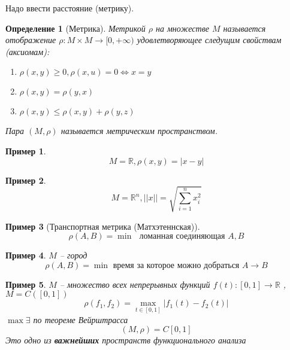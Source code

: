 \documentclass[14pt]{extarticle}
\newtheorem{definition}{Определение}
\newtheorem{example}{Пример}[definition]
\begin{document}
Надо ввести расстояние (метрику).
\begin{definition}[Метрика]
	Метрикой $\rho$ на множестве  $M$ 
	называется отображение  $\rho : M \times M \to [0,+ \infty)$
	удовлетворяющее следущим свойствам (аксиомам):
	 \begin{enumerate}
		\item $\rho(x,y) \ge 0, \rho(x,u) = 0 \iff x = y$
		\item $\rho(x,y) = \rho(y,x)$
		\item  $\rho(x,y) \le \rho(x,y) + \rho(y,z)$
	\end{enumerate}
	Пара $(M,\rho)$ называется метрическим пространством.
\end{definition}
\begin{example}
	\begin{equation}
		M = \mathbb{R}, \rho(x,y) = |x- y|
	\end{equation}
\end{example}
\begin{example}
	\begin{equation}
		M = \mathbb{R}^{n}, ||x|| =  \sqrt{\sum_{i=1}^{n}x_{i}^2} 
	\end{equation}
\end{example}
\begin{example}[Транспортная метрика (Матхэтеннская)]
	\begin{equation}
		\rho(A,B) = \min \text{~ ломанная соединяющая } A, B
	\end{equation}
\end{example}
\begin{example}
	$M$ -- город
	 \begin{equation}
		 \rho(A,B) = \min \text{ время за которое можно добраться~} A \to B
	\end{equation}
\end{example}
\begin{example}
	$M$ -- множество всех непрерывных функций $f(t): [0,1] \to \mathbb{R}$ , $M = C([0,1])$ 
	\begin{equation}
		\rho(f_1,f_2) = \max_{t \in[0,1]} |f_1(t) - f_2(t)|
	\end{equation}
	$\max \exists $ по теореме Вейрштрасса
	\begin{equation}
		(M,\rho) = C[0,1]
	\end{equation}
	Это одно из \textbf{важнейших} пространств функционального анализа
\end{example}
\end{document}
